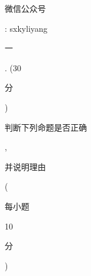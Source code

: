 \documentclass[10pt]{article}
\begin{document}
\begin{CJK}{UTF8}{mj}微信公众号\end{CJK}: sxkyliyang

\begin{CJK}{UTF8}{mj}一\end{CJK}. (30 \begin{CJK}{UTF8}{mj}分\end{CJK}) \begin{CJK}{UTF8}{mj}判断下列命题是否正确\end{CJK}, \begin{CJK}{UTF8}{mj}并说明理由\end{CJK} (\begin{CJK}{UTF8}{mj}每小题\end{CJK} 10 \begin{CJK}{UTF8}{mj}分\end{CJK})
\end{document}
